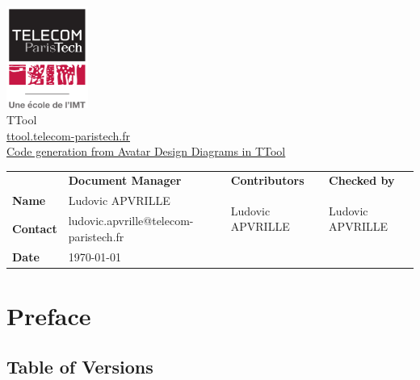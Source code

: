 \documentclass[12pt]{article}
\begin{document}
\sloppy 

\begin{center}

\includegraphics[width=0.2\textwidth]{figures/logotpt}
\vspace{10 pt}\\
\Huge TTool \\
\vspace{10 pt}
\Large \url{ttool.telecom-paristech.fr}
\vspace{20 pt}\\
\underline{\Large Code generation from Avatar Design Diagrams in TTool}
\vspace{30 pt}
\end{center}

\begin{table}[H]
\large
\centering
\begin{adjustbox}{width=\textwidth}
\begin{tabular}{ |p{1.6cm}|p{6.0cm}|p{4.2cm}|p{4.2cm}| }
\hhline{----}
 & \textbf{Document Manager} & \textbf{Contributors}  & \textbf{Checked by}  \\ 
\hhline{----}
\textbf{Name}   & Ludovic APVRILLE & \multirow{2}{*}{Ludovic APVRILLE} &
\multirow{2}{*}{Ludovic APVRILLE} \\
\hhline{--~~}
\textbf{Contact} & ludovic.apvrille@telecom-paristech.fr &  &  \\ 
\hhline{--~~}
\textbf{Date} & \today &  &  \\ 
\hline
\end{tabular}
\end{adjustbox}
\end{table}

\newpage
\tableofcontents


\newpage
\section{Preface}

\subsection{Table of Versions}
\end{document}
